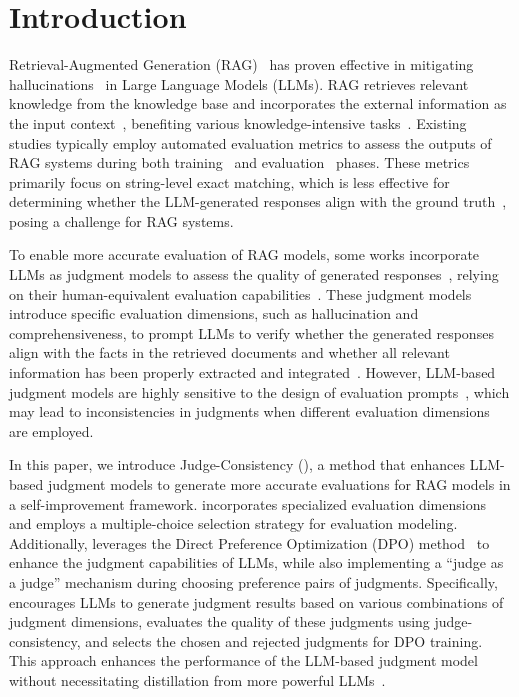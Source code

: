 \section{Introduction}
Retrieval-Augmented Generation (RAG)~\cite{REALM2020Guu,Retrieval2020Lewis,asai2023self,shi2023replug} has proven effective in mitigating hallucinations~\cite{elazar2021measuring,ji2023survey,shuster2021retrieval,huang2023survey} in Large Language Models (LLMs). RAG retrieves relevant knowledge from the knowledge base and incorporates the external information as the input context~\cite{Ram2023Incontextlearning}, benefiting various knowledge-intensive tasks~\cite{trivedi2023interleaving,izacard2022few,he2021efficient}. Existing studies typically employ automated evaluation metrics to assess the outputs of RAG systems during both training~\cite{rag-ddr2024Li} and evaluation~\cite{Radit2023Lin,Retrieval2023Gao} phases. These metrics primarily focus on string-level exact matching, which is less effective for determining whether the LLM-generated responses align with the ground truth~\cite{EnablingLargeLanguageModelstoGenerateTextwithCitations2023GaoTianyu,saad2024ares}, posing a challenge for RAG systems.




To enable more accurate evaluation of RAG models, some works incorporate LLMs as judgment models to assess the quality of generated responses~\cite{saad2024ares,friel2024ragbench,adlakha2023evaluating}, relying on their human-equivalent evaluation capabilities~\cite{chiang2023can,zheng2023judging,sottana2023evaluation}. These judgment models introduce specific evaluation dimensions, such as hallucination and comprehensiveness, to prompt LLMs to verify whether the generated responses align with the facts in the retrieved documents and whether all relevant information has been properly extracted and integrated~\cite{jin2024rag,jacovi2025facts,Rageval2024Zhu}. However, LLM-based judgment models are highly sensitive to the design of evaluation prompts~\cite{zhou2023survival,liu2024aligning}, which may lead to inconsistencies in judgments when different evaluation dimensions are employed.

In this paper, we introduce Judge-Consistency (\method{}), a method that enhances LLM-based judgment models to generate more accurate evaluations for RAG models in a self-improvement framework. \method{} incorporates specialized evaluation dimensions and employs a multiple-choice selection strategy for evaluation modeling. Additionally, \method{} leverages the Direct Preference Optimization (DPO) method~\cite{DPO2023Rafailov} to enhance the judgment capabilities of LLMs, while also implementing a ``judge as a judge'' mechanism during choosing preference pairs of judgments. Specifically, \method{} encourages LLMs to generate judgment results based on various combinations of judgment dimensions, evaluates the quality of these judgments using judge-consistency, and selects the chosen and rejected judgments for DPO training. This approach enhances the performance of the LLM-based judgment model without necessitating distillation from more powerful LLMs~\cite{zhang2025rag}.

